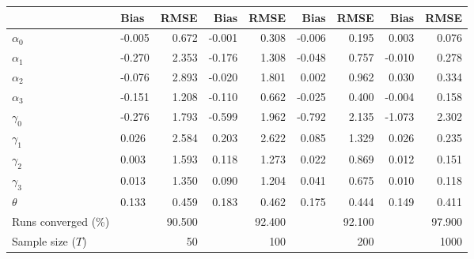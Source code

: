 
\begin{tabular}[t]{llrrrrrrr}
\toprule
  & Bias & RMSE & Bias & RMSE & Bias & RMSE & Bias & RMSE\\
\midrule
$\alpha_{0}$ & -0.005 & 0.672 & -0.001 & 0.308 & -0.006 & 0.195 & 0.003 & 0.076\\
$\alpha_{1}$ & -0.270 & 2.353 & -0.176 & 1.308 & -0.048 & 0.757 & -0.010 & 0.278\\
$\alpha_{2}$ & -0.076 & 2.893 & -0.020 & 1.801 & 0.002 & 0.962 & 0.030 & 0.334\\
$\alpha_{3}$ & -0.151 & 1.208 & -0.110 & 0.662 & -0.025 & 0.400 & -0.004 & 0.158\\
$\gamma_{0}$ & -0.276 & 1.793 & -0.599 & 1.962 & -0.792 & 2.135 & -1.073 & 2.302\\
$\gamma_{1}$ & 0.026 & 2.584 & 0.203 & 2.622 & 0.085 & 1.329 & 0.026 & 0.235\\
$\gamma_{2}$ & 0.003 & 1.593 & 0.118 & 1.273 & 0.022 & 0.869 & 0.012 & 0.151\\
$\gamma_{3}$ & 0.013 & 1.350 & 0.090 & 1.204 & 0.041 & 0.675 & 0.010 & 0.118\\
$\theta$ & 0.133 & 0.459 & 0.183 & 0.462 & 0.175 & 0.444 & 0.149 & 0.411\\
Runs converged (\%) &  & 90.500 &  & 92.400 &  & 92.100 &  & 97.900\\
Sample size ($T$) &  & 50 &  & 100 &  & 200 &  & 1000\\
\bottomrule
\end{tabular}

